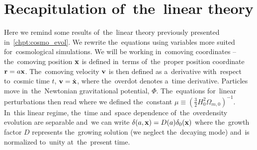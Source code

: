 \section{Recapitulation of~the~linear theory}
Here we remind some results of~the~linear theory previously presented in~\autoref{chpt:cosmo_evol}. We rewrite the~equations using variables more suited for~cosmological simulations. We will be working in~comoving coordinates -- the~comoving position $\mathbf x$ is defined in~terms of~the~proper position coordinate $\mathbf r = a\mathbf x$. The~comoving velocity $\mathbf v$ is then defined as a~derivative with~respect to~cosmic time $t$, $\mathbf v = \dot{\mathbf x}$, where the~overdot denotes a~time derivative. Particles move in~the~Newtonian gravitational potential, $\Phi$. The~equations for~linear perturbations then read
where we defined the~constant $\mu\equiv\left(\frac32 H_0^2\Omega_{m, 0}\right)^{-1}$. In~this linear regime, the~time and~space dependence of~the~overdensity evolution are separable and~we can write $\delta(a, \mathbf x)=D(a)\delta_0(\mathbf x)$ where the~growth factor $D$ represents the~growing solution (we neglect the~decaying mode) and~is normalized to~unity at~the~present time.

